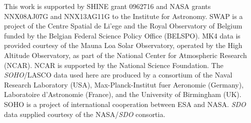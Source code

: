 \documentclass[namedreferences]{solarphysics}
\begin{document}
\begin{article}
%
  

%



%
 \begin{acks}
 
This work is supported by SHINE grant 0962716 and NASA grants NNX08AJ07G and NNX13AG11G to the Institute for Astronomy.
SWAP is a project of the Centre Spatial de Li'ege and the Royal Observatory of Belgium funded by the Belgian Federal Science Policy Office (BELSPO).
MK4 data is provided courtesy of the Mauna Loa Solar Observatory, operated by the High Altitude Observatory, as part of the National Center for Atmospheric Research (NCAR). NCAR is supported by the National Science Foundation.
The \emph{SOHO}/LASCO data used here are produced by a consortium of the Naval Research Laboratory (USA), Max-Planck-Institut fuer Aeronomie (Germany), Laboratoire d'Astronomie (France), and the University of Birmingham (UK). SOHO is a project of international cooperation between ESA and NASA.
\emph{SDO} data supplied courtesy of the NASA/\emph{SDO} consortia.

 \end{acks}


%
%
 
   
%
%
%   
%  

\end{article} 
\end{document}
